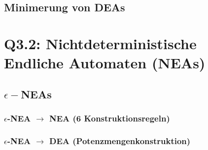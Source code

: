 \documentclass{book}
\begin{document}
\subsection{Minimerung von DEAs}
\section{Q3.2: Nichtdeterministische Endliche Automaten (NEAs)}
\subsection{$\epsilon-$NEAs}
\subsubsection{$\epsilon$-NEA $\rightarrow$ NEA (6 Konstruktionsregeln)}
\subsubsection{$\epsilon$-NEA $\rightarrow$ DEA (Potenzmengenkonstruktion)}
\end{document}
